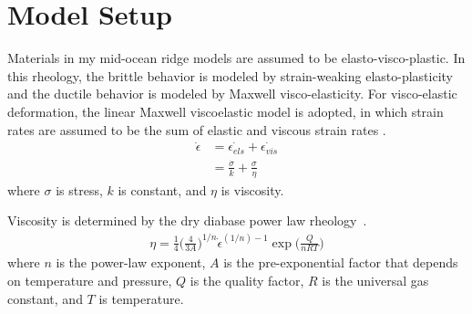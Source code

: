 \documentclass[letterpaper,12pt,notitle]{memphisthesis}                     %
\begin{document}
\section{Model Setup}
Materials in my mid-ocean ridge models are assumed to be elasto-visco-plastic. In this rheology, the brittle behavior is modeled by strain-weaking elasto-plasticity and the ductile behavior is modeled by Maxwell visco-elasticity. 
For visco-elastic deformation, the linear Maxwell viscoelastic model is adopted, in which strain rates are assumed to be the sum of elastic and viscous strain rates .
\begin{align} \label{srate}
  \dot{\epsilon} &=  \dot{\epsilon_{els}} +  \dot{\epsilon_{vis}} \\
                        &= \frac{ \dot{\sigma}}{k} + \frac{\sigma}{\eta}
\end{align}
where $\sigma$ is stress, $k$ is constant, and $\eta$ is viscosity.

%
Viscosity is determined by the dry diabase power law rheology~\citep{Kirby1987, Chen1990}.
\begin{align} \label{Visc}
 \eta = \frac{1}{4} \bigg( \frac{4}{3A} \bigg)^{1/n} \dot{\epsilon}^{(1/n)-1} \exp\bigg(\frac{Q}{nRT}\bigg)
\end{align}
where $n$ is the power-law exponent, $A$ is the pre-exponential factor that depends on temperature and pressure, $Q$ is the quality factor, $R$ is the universal gas constant, and $T$ is temperature.
%
\end{document}
